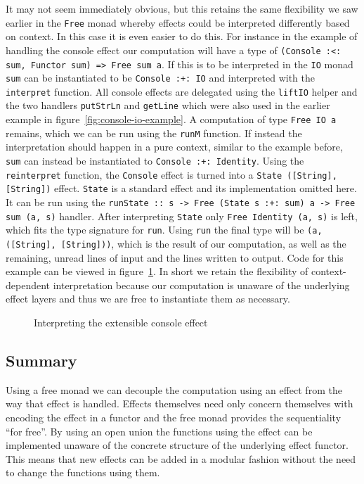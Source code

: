 It may not seem immediately obvious, but this retains the same flexibility we
saw earlier in the \texttt{Free} monad whereby effects could be interpreted
differently based on context. In this case it is even easier to do this. For
instance in the example of handling the console effect our computation will have
a type of \texttt{(Console :<: sum, Functor sum) => Free sum a}. If this is to
be interpreted in the \texttt{IO} monad \texttt{sum} can be instantiated to be
\texttt{Console :+: IO} and interpreted with the \texttt{interpret} function.
All console effects are delegated using the \texttt{liftIO} helper and the two
handlers \texttt{putStrLn} and \texttt{getLine} which were also used in the
earlier example in figure~\ref{fig:console-io-example}. A computation of type
\texttt{Free IO a} remains, which we can be run using the \texttt{runM}
function. If instead the interpretation should happen in a pure context, similar
to the example before, \texttt{sum} can instead be instantiated to
\texttt{Console :+: Identity}. Using the \texttt{reinterpret} function, the
\texttt{Console} effect is turned into a \texttt{State ([String], [String])}
effect. \texttt{State} is a standard effect and its implementation omitted here.
It can be run using the \texttt{runState :: s -> Free (State s :+: sum) a ->
  Free sum (a, s)} handler. After interpreting \texttt{State} only \texttt{Free
  Identity (a, s)} is left, which fits the type signature for \texttt{run}.
Using \texttt{run} the final type will be \texttt{(a, ([String], [String]))},
which is the result of our computation, as well as the remaining, unread lines
of input and the lines written to output. Code for this example can be viewed in
figure~\ref{fig:run-console}. In short we retain the flexibility of
context-dependent interpretation because our computation is unaware of the
underlying effect layers and thus we are free to instantiate them as necessary.

\begin{figure}
  
  \caption{Interpreting the extensible console effect}
  \label{fig:run-console}
\end{figure}

\subsection{Summary}

Using a free monad we can decouple the computation using an effect from the way
that effect is handled. Effects themselves need only concern themselves with
encoding the effect in a functor and the free monad provides the sequentiality
``for free''. By using an open union the functions using the effect can be
implemented unaware of the concrete structure of the underlying effect functor.
This means that new effects can be added in a modular fashion without the need
to change the functions using them.

